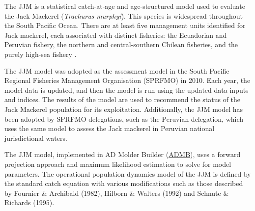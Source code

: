 \documentclass{article}
\begin{document}
The JJM is a statistical catch-at-age and age-structured model used to evaluate the Jack Mackerel (\textit{Trachurus murphyi}). This species is widespread throughout the South Pacific Ocean. There are at least five management units identified for Jack mackerel, each associated with distinct fisheries: the Ecuadorian and Peruvian fishery, the northern and central-southern Chilean fisheries, and the purely high-sea fishery \cite{sc10report}.




The JJM model was adopted as the assessment model in the South Pacific Regional Fisheries Management Organisation (SPRFMO) in 2010. Each year, the model data is updated, and then the model is run using the updated data inputs and indices. The results of the model are used to recommend the status of the Jack Mackerel population for its exploitation. Additionally, the JJM model has been adopted by SPRFMO delegations, such as the Peruvian delegation, which uses the same model to assess the Jack mackerel in Peruvian national jurisdictional waters.

The JJM model, implemented in AD Molder Builder (\href{https://www.admb-project.org/}{ADMB}), uses a forward projection approach and maximum likelihood estimation to solve for model parameters. The operational population dynamics model of the JJM is defined by the standard catch equation with various modifications such as those described by Fournier \& Archibald (1982)\cite{fournier-1982}, Hilborn \& Walters (1992) \cite{Hilborn1992} and Schnute \& Richards (1995)\cite{schnute-1995}.\\


\end{document}
